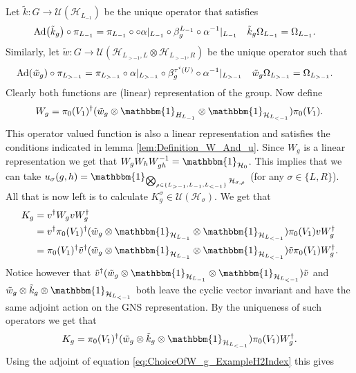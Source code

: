 \documentclass[12pt,a4paper,twoside]{article}
\let\originalleft\left
\let\originalright\right
\renewcommand{\left}{\mathopen{}\mathclose\bgroup\originalleft}
\renewcommand{\right}{\aftergroup\egroup\originalright}
\newcommand{\UU}{\mathcal U}
\newcommand{\HH}{\mathcal H}
\newcommand{\id}{\mathbbm{1}}
\newcommand{\Ad}[1]{\textrm{Ad}\left(#1\right)}
\theoremstyle{definition}
\numberwithin{equation}{section}
\begin{document}
Let $\tilde k:G\rightarrow \UU(\HH_{L_{-1}})$ be the unique operator that satisfies
\begin{align}
	\Ad{\tilde{k}_g}\circ\pi_{L_{-1}}&=\pi_{L_{-1}}\circ \circ\alpha|_{L_{-1}}\circ\beta_g^{L_{-1}}\circ \alpha^{-1}|_{L_{-1}}&\tilde k_g\Omega_{L_{-1}}&=\Omega_{L_{-1}}.
\end{align}
Similarly, let $\tilde{w}:G\rightarrow\UU(\HH_{L_{>-1},L}\otimes\HH_{L_{>-1},R})$ be the unique operator such that
\begin{align}
	\Ad{\tilde w_{g}}\circ\pi_{L_{>-1}}&=\pi_{L_{>-1}}\circ\alpha|_{L_{>-1}}\circ\beta_g^{\tau^{i}(U)}\circ \alpha^{-1}|_{L_{>-1}}&\tilde w_{g}\Omega_{L_{>-1}}&=\Omega_{L_{>-1}}.
\end{align}
Clearly both functions are (linear) representation of the group. Now define
\begin{equation}\label{eq:ChoiceOfW_g_ExampleH2Index}
	W_g=\pi_{0}(V_1)^{\dagger}(\tilde{w}_g\otimes\id_{H_{L_{-1}}}\otimes\id_{\HH_{L_{<-1}}}) \pi_{0}(V_1).
\end{equation}
This operator valued function is also a linear representation and satisfies the conditions indicated in lemma \ref{lem:Definition_W_And_u}. Since $W_g$ is a linear representation we get that $W_gW_hW_{gh}^{-1}=\id_{\HH_0}$. This implies that we can take $u_\sigma(g,h)=\id_{\bigotimes_{\rho\in\{L_{>-1},L_{-1},L_{<-1}\}}\HH_{\sigma,\rho}}$ (for any $\sigma\in\{L,R\}$). All that is now left is to calculate $K^\sigma_g\in\UU(\HH_\sigma)$. We get that
\begin{align}
	K_g&=v^\dagger W_g v W_g^\dagger\\
	&=v^\dagger \pi_{0}(V_1)^{\dagger}(\tilde{w}_g\otimes\id_{\HH_{L_{-1}}}\otimes\id_{\HH_{L_{<-1}}}) \pi_{0}(V_1) v W_g^\dagger\\
	&=\pi_{0}(V_1)^{\dagger}\tilde v^\dagger(\tilde{w}_g\otimes\id_{\HH_{L_{-1}}}\otimes\id_{\HH_{L_{<-1}}}) \tilde v \pi_{0}(V_1) W_g^\dagger.
\end{align}
Notice however that $\tilde v^\dagger(\tilde{w}_g\otimes\id_{\HH_{L_{-1}}}\otimes\id_{\HH_{L_{<-1}}}) \tilde v$ and $\tilde{w}_g\otimes\tilde{k}_g\otimes\id_{\HH_{L_{<-1}}}$ both leave the cyclic vector invariant and have the same adjoint action on the GNS representation. By the uniqueness of such operators we get that
\begin{equation}
	K_g=\pi_{0}(V_1)^{\dagger}(\tilde{w}_g\otimes\tilde{k}_g\otimes\id_{\HH_{L_{<-1}}}) \pi_{0}(V_1) W_g^\dagger.
\end{equation}
Using the adjoint of equation \eqref{eq:ChoiceOfW_g_ExampleH2Index} this gives
\end{document}
